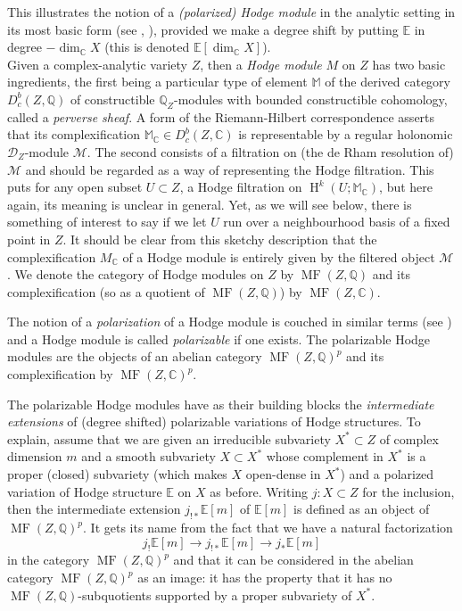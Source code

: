 \documentclass[12pt,letterpaper]{amsart}
\numberwithin{equation}{section}
\def\CC{{\mathbb C}}
\def\EE{{\mathbb E}}
\def\MM{{\mathbb M}}
\def\QQ{{\mathbb Q}}
\def\Mcal{{\mathcal M}}
\def\Dscr{{\mathscr D}}
\newcommand\Hl{\operatorname{H}}
\newcommand\MF{\operatorname{MF}}
\theoremstyle{remark}
\begin{document}
This illustrates  the notion of a \emph{(polarized) Hodge module} in the analytic setting  in its most basic  form 
(see \cite{saito:hmodules}, \cite{saito:guide}), provided we make a degree  shift by putting $\EE$ in degree  
$-\dim_\CC X$ (this is denoted $\EE[\dim_\CC X]$). \\

Given 
a complex-analytic variety  $Z$, then a \emph{Hodge module} $M$ on $Z$ has two basic  ingredients, the first
being  a particular 
type of element $\MM$ of the derived category $D_c^b(Z,\QQ)$ of constructible $\QQ_Z$-modules with bounded constructible cohomology,  called a \emph{perverse sheaf}.  A form of the 
Riemann-Hilbert correspondence asserts that its complexification  $\MM_\CC\in D_c^b(Z,\CC)$ is representable 
by a regular holonomic  $\Dscr_Z$-module $\Mcal$. The  second consists of a filtration  on (the de Rham  resolution of) $\Mcal$ and should be regarded as a way of representing the 
Hodge filtration. This puts for any open subset $U\subset Z$, a Hodge filtration on $\Hl^k(U;\MM_\CC)$,  
but here again, its meaning is unclear in general.  Yet, as we will see below,  there is something of interest to say  
if we let $U$ run over a  neighbourhood basis  of a fixed point in $Z$. It should be clear from this sketchy  description that  the complexification $M_\CC$ of a Hodge module is entirely given by the filtered object $\Mcal$. 
We denote the category  of Hodge modules on $Z$ by  $\MF (Z,\QQ)$ and its complexification  (so as a quotient of $\MF (Z,\QQ)$) by  $\MF (Z,\CC)$. 

The notion  of a \emph{polarization} of a Hodge module  is couched in similar terms (see \cite{saito:hmodules}) 
and a Hodge module is called \emph{polarizable} if one exists. 
The polarizable Hodge modules are the  objects of  an abelian category $\MF (Z,\QQ)^p$ and its complexification by  $\MF (Z,\CC)^p$.  

The polarizable Hodge modules  have as their building blocks the  \emph{intermediate extensions} of (degree shifted) polarizable variations of 
Hodge structures. To explain, assume that we are given an irreducible subvariety $X^*\subset Z$ of complex dimension 
$m$ and a smooth subvariety $X\subset X^*$ whose complement in $X^*$  is a proper (closed) subvariety (which makes $X$ open-dense in $X^*$) and a polarized variation of 
Hodge structure $\EE$ on $X$ as before.
Writing   $j: X\subset Z$  for the inclusion, then the  intermediate extension
$j_{!*}\EE[m]$ of $\EE[m]$ is defined as  an object of $\MF(Z, \QQ)^p$. 
It gets its name from the fact that we have a natural factorization 
\[
j_!\EE[m]\to j_{!*}\EE[m]\to j_{*}\EE[m]
\]
in the category $\MF (Z,\QQ)^p$ and that it can be considered in the abelian category $\MF (Z,\QQ)^p$ as an image: it 
has the property that it has no $\MF (Z,\QQ)$-subquotients  supported by a proper subvariety of $X^*$. 
\end{document}
